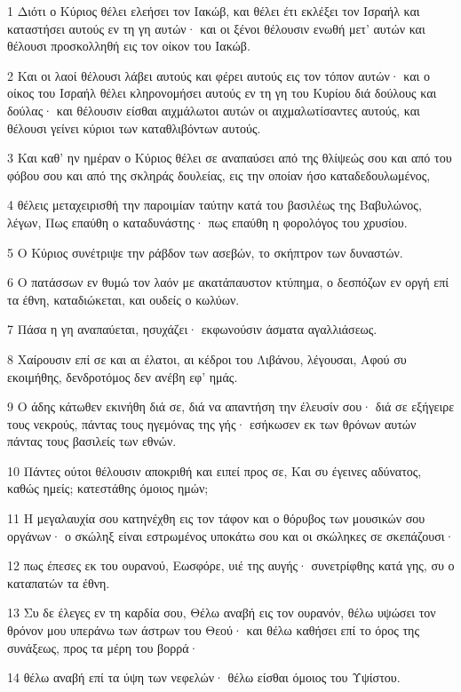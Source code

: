 \par 1 Διότι ο Κύριος θέλει ελεήσει τον Ιακώβ, και θέλει έτι εκλέξει τον Ισραήλ και καταστήσει αυτούς εν τη γη αυτών· και οι ξένοι θέλουσιν ενωθή μετ' αυτών και θέλουσι προσκολληθή εις τον οίκον του Ιακώβ.
\par 2 Και οι λαοί θέλουσι λάβει αυτούς και φέρει αυτούς εις τον τόπον αυτών· και ο οίκος του Ισραήλ θέλει κληρονομήσει αυτούς εν τη γη του Κυρίου διά δούλους και δούλας· και θέλουσιν είσθαι αιχμάλωτοι αυτών οι αιχμαλωτίσαντες αυτούς, και θέλουσι γείνει κύριοι των καταθλιβόντων αυτούς.
\par 3 Και καθ' ην ημέραν ο Κύριος θέλει σε αναπαύσει από της θλίψεώς σου και από του φόβου σου και από της σκληράς δουλείας, εις την οποίαν ήσο καταδεδουλωμένος,
\par 4 θέλεις μεταχειρισθή την παροιμίαν ταύτην κατά του βασιλέως της Βαβυλώνος, λέγων, Πως επαύθη ο καταδυνάστης· πως επαύθη η φορολόγος του χρυσίου.
\par 5 Ο Κύριος συνέτριψε την ράβδον των ασεβών, το σκήπτρον των δυναστών.
\par 6 Ο πατάσσων εν θυμώ τον λαόν με ακατάπαυστον κτύπημα, ο δεσπόζων εν οργή επί τα έθνη, καταδιώκεται, και ουδείς ο κωλύων.
\par 7 Πάσα η γη αναπαύεται, ησυχάζει· εκφωνούσιν άσματα αγαλλιάσεως.
\par 8 Χαίρουσιν επί σε και αι έλατοι, αι κέδροι του Λιβάνου, λέγουσαι, Αφού συ εκοιμήθης, δενδροτόμος δεν ανέβη εφ' ημάς.
\par 9 Ο άδης κάτωθεν εκινήθη διά σε, διά να απαντήση την έλευσίν σου· διά σε εξήγειρε τους νεκρούς, πάντας τους ηγεμόνας της γής· εσήκωσεν εκ των θρόνων αυτών πάντας τους βασιλείς των εθνών.
\par 10 Πάντες ούτοι θέλουσιν αποκριθή και ειπεί προς σε, Και συ έγεινες αδύνατος, καθώς ημείς; κατεστάθης όμοιος ημών;
\par 11 Η μεγαλαυχία σου κατηνέχθη εις τον τάφον και ο θόρυβος των μουσικών σου οργάνων· ο σκώληξ είναι εστρωμένος υποκάτω σου και οι σκώληκες σε σκεπάζουσι·
\par 12 πως έπεσες εκ του ουρανού, Εωσφόρε, υιέ της αυγής· συνετρίφθης κατά γης, συ ο καταπατών τα έθνη.
\par 13 Συ δε έλεγες εν τη καρδία σου, Θέλω αναβή εις τον ουρανόν, θέλω υψώσει τον θρόνον μου υπεράνω των άστρων του Θεού· και θέλω καθήσει επί το όρος της συνάξεως, προς τα μέρη του βορρά·
\par 14 θέλω αναβή επί τα ύψη των νεφελών· θέλω είσθαι όμοιος του Υψίστου.
